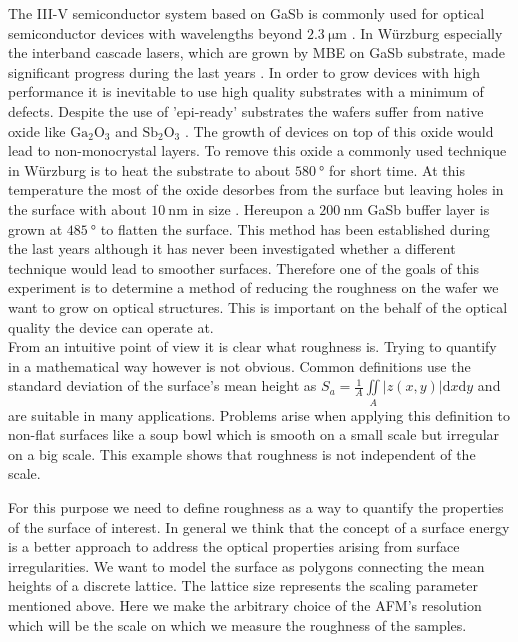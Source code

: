 The III-V semiconductor system based on GaSb is commonly used for optical semiconductor devices with wavelengths beyond $\SI{2.3}{\micro\meter}$ \cite{arafin}. In Würzburg especially the interband cascade lasers, which are grown by MBE on GaSb substrate, made significant progress during the last years \cite{weih}. In order to grow devices with high performance it is inevitable to use high quality substrates with a minimum of defects. Despite the use of 'epi-ready' substrates the wafers suffer from native oxide like $\mathrm{Ga}_2 \mathrm{O}_3$ and $\mathrm{Sb}_2 \mathrm{O}_3$ \cite{vineis}. The growth of devices on top of this oxide would lead to non-monocrystal layers. To remove this oxide a commonly used technique in Würzburg is to heat the substrate to about $\SI{580}{\degree}$ for short time. At this temperature the most of the oxide desorbes from the surface but leaving holes in the surface with about  $\SI{10}{\nano\meter}$ in size \cite{murray}. Hereupon a $\SI{200}{\nano\meter}$ GaSb buffer layer is grown at $\SI{485}{\degree}$ to flatten the surface. This method has been established during the last years although it has never been investigated whether a different technique would lead to smoother surfaces. Therefore one of the goals of this experiment is to determine a method of reducing the roughness on the wafer we want to grow on optical structures. This is important on the behalf of the optical quality the device can operate at.\\
From an intuitive point of view it is clear what roughness is. Trying to quantify in a mathematical way however is not obvious. Common definitions use the standard deviation of the surface's mean height as 
$ S_a = \frac{1}{A} \iint\limits_{A}  \vert z \left( x,y \right)  \vert \mathrm dx \mathrm dy $ and are suitable in many applications. Problems arise when applying this definition to non-flat surfaces like a soup bowl which is smooth on a small scale but irregular on a big scale. This example shows that roughness is not independent of the scale. 

For this purpose we need to define roughness as a way to quantify the properties 
of the surface of interest.
In general we think that the concept of a surface energy is a better approach to address 
the optical properties arising from surface irregularities. 
We want to model the surface as polygons connecting the mean heights of a discrete lattice.
The lattice size represents the scaling parameter mentioned above. Here we make the arbitrary choice of the AFM's resolution which will be the scale on which we measure the roughness of the samples.


